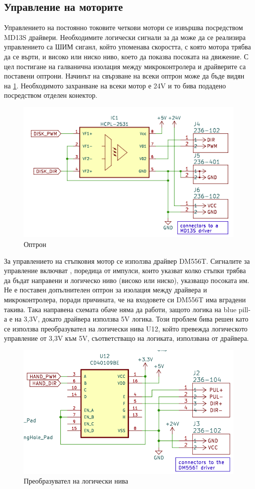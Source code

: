 \subsection{Управление на моторите}

Управлението на постоянно токовите четкови мотори се извършва посредством MD13S драйвери. Необходимите логически сигнали за да може да се реализира управлението са ШИМ сиганл, който упоменава скоростта, с която мотора трябва да се върти, и високо или ниско ниво, което да показва посоката на движение. С цел постигане на галванична изолация между микроконтролера и драйверите са поставени оптрони. Начинът на свързване на всеки оптрон може да бъде видян на \cref{fig:brushed-control}. Необходимото захранване на всеки мотор е 24V и то бива подадено посредством отделен конектор.

\begin{figure}[H]
    \centering
    \includegraphics[width=0.6\linewidth]{images/brushed-control.png}
    
    \caption{Оптрон}
    \label{fig:brushed-control} 
\end{figure}

За управлението на стъпковия мотор се използва драйвер DM556T. Сигналите за управление включват , поредица от импулси, които указват колко стъпки трябва да бъдат направени и логическо ниво (високо или ниско), указващо посоката им. Не е поставен допълнителен оптрон за изолация между драйвера и микроконтролера, поради причината, че на входовете си DM556T има вградени такива. Така направена схемата обаче няма да работи, защото логика на blue pill-а е на 3,3V, докато драйвера използва 5V логика. Този проблем бива решен като се използва преобразувател на логически нива U12, който превежда логическото управление от 3,3V към 5V, съответстващо на логиката, използвана от драйвера.

\begin{figure}[H]
    \centering
    \includegraphics[width=0.6\linewidth]{images/stepper-control.png}
    
    \caption{Преобразувател на логически нива}
    \label{fig:stepper-control} 
\end{figure}



